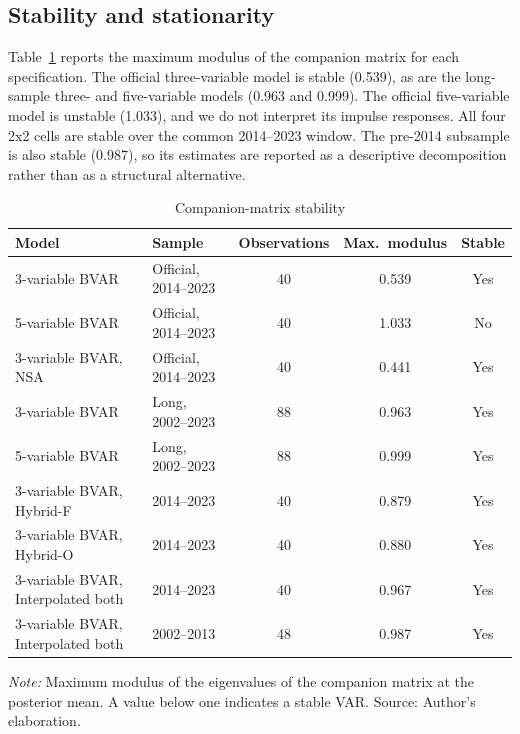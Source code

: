 \documentclass[11pt,a4paper]{article}
\begin{document}
\subsection{Stability and stationarity}
\label{sec:stability}

Table~\ref{tab:stability} reports the maximum modulus of the companion matrix for each specification. The official three-variable model is stable (0.539), as are the long-sample three- and five-variable models (0.963 and 0.999). The official five-variable model is unstable (1.033), and we do not interpret its impulse responses. All four 2x2 cells are stable over the common 2014--2023 window. The pre-2014 subsample is also stable (0.987), so its estimates are reported as a descriptive decomposition rather than as a structural alternative.

\begin{table}[htbp]
\centering
\small
\caption{Companion-matrix stability}
\label{tab:stability}
\begin{tabular}{@{}llccc@{}}
\toprule
Model & Sample & Observations & Max.\ modulus & Stable \\
\midrule
3-variable BVAR & Official, 2014--2023 & 40 & 0.539 & Yes \\
5-variable BVAR & Official, 2014--2023 & 40 & 1.033 & No \\
3-variable BVAR, NSA & Official, 2014--2023 & 40 & 0.441 & Yes \\
3-variable BVAR & Long, 2002--2023 & 88 & 0.963 & Yes \\
5-variable BVAR & Long, 2002--2023 & 88 & 0.999 & Yes \\
3-variable BVAR, Hybrid-F & 2014--2023 & 40 & 0.879 & Yes \\
3-variable BVAR, Hybrid-O & 2014--2023 & 40 & 0.880 & Yes \\
3-variable BVAR, Interpolated both & 2014--2023 & 40 & 0.967 & Yes \\
3-variable BVAR, Interpolated both & 2002--2013 & 48 & 0.987 & Yes \\
\bottomrule
\end{tabular}
\par\vspace{0.3em}
\begin{minipage}{0.95\textwidth}
\footnotesize\textit{Note:} Maximum modulus of the eigenvalues of the companion matrix at the posterior mean. A value below one indicates a stable VAR. Source: Author's elaboration.
\end{minipage}
\end{table}
\end{document}
